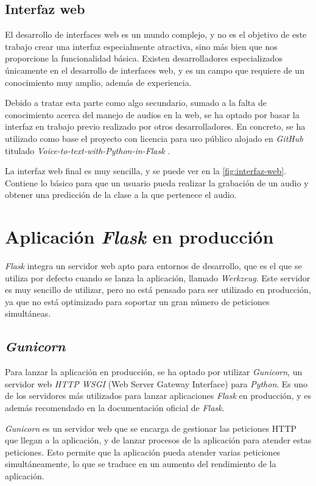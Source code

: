 \subsection{Interfaz web}
El desarrollo de interfaces web es un mundo complejo, y no es el objetivo de este trabajo crear una interfaz especialmente atractiva, sino más bien que nos proporcione la funcionalidad básica.
Existen desarrolladores especializados únicamente en el desarrollo de interfaces web, y es un campo que requiere de un conocimiento muy amplio, además de experiencia.

Debido a tratar esta parte como algo secundario, sumado a la falta de conocimiento acerca del manejo de audios en la web, se ha optado por basar la interfaz en trabajo previo realizado por otros desarrolladores.
En concreto, se ha utilizado como base el proyecto con licencia para uso público alojado en \textit{GitHub} titulado \textit{Voice-to-text-with-Python-in-Flask} \cite{voice-to-text-with-python-in-flask}.

La interfaz web final es muy sencilla, y se puede ver en la \autoref{fig:interfaz-web}.
Contiene lo básico para que un usuario pueda realizar la grabación de un audio y obtener una predicción de la clase a la que pertenece el audio.



\section{Aplicación \textit{Flask} en producción}
\textit{Flask} integra un servidor web apto para entornos de desarrollo, que es el que se utiliza por defecto cuando se lanza la aplicación, llamado \textit{Werkzeug}.
Este servidor es muy sencillo de utilizar, pero no está pensado para ser utilizado en producción, ya que no está optimizado para soportar un gran número de peticiones simultáneas.


\subsection{\textit{Gunicorn}}
Para lanzar la aplicación en producción, se ha optado por utilizar \textit{Gunicorn}, un servidor web \textit{HTTP WSGI} (Web Server Gateway Interface)
para \textit{Python}.
Es uno de los servidores más utilizados para lanzar aplicaciones \textit{Flask} en producción, y es además recomendado en la documentación oficial de \textit{Flask}.

\textit{Gunicorn} es un servidor web que se encarga de gestionar las peticiones HTTP que llegan a la aplicación, y de lanzar procesos de la aplicación para atender estas peticiones.
Esto permite que la aplicación pueda atender varias peticiones simultáneamente, lo que se traduce en un aumento del rendimiento de la aplicación.

